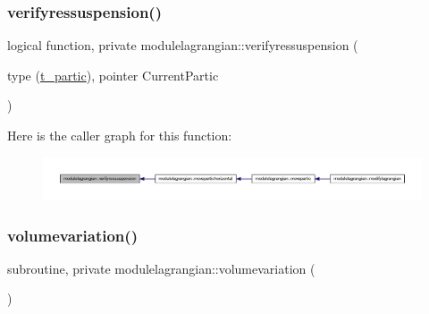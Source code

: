 \subsubsection{\texorpdfstring{verifyressuspension()}{verifyressuspension()}}
{\footnotesize\ttfamily logical function, private modulelagrangian\+::verifyressuspension (\begin{DoxyParamCaption}\item[{type (\mbox{\hyperlink{structmodulelagrangian_1_1t__partic}{t\+\_\+partic}}), pointer}]{Current\+Partic }\end{DoxyParamCaption})\hspace{0.3cm}{\ttfamily [private]}}

Here is the caller graph for this function\+:\nopagebreak
\begin{figure}[H]
\begin{center}
\leavevmode
\includegraphics[width=350pt]{namespacemodulelagrangian_af983501fcd8d5abbf81124ad3229d435_icgraph}
\end{center}
\end{figure}
\mbox{\label{namespacemodulelagrangian_aac3ffc27a32f64e9bc13d06c25227655}} 
\subsubsection{\texorpdfstring{volumevariation()}{volumevariation()}}
{\footnotesize\ttfamily subroutine, private modulelagrangian\+::volumevariation (\begin{DoxyParamCaption}{ }\end{DoxyParamCaption})\hspace{0.3cm}{\ttfamily [private]}}

